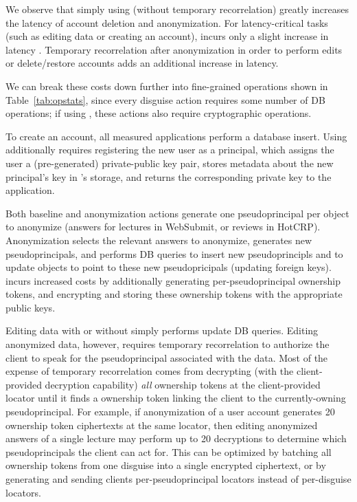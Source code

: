We observe that simply using \sys (without temporary recorrelation) greatly increases the latency of
account deletion and anonymization.  For latency-critical tasks (such as editing data or creating an
account), \sys incurs only a slight increase in latency . Temporary recorrelation
after anonymization in order to perform edits or delete/restore accounts adds an additional
 increase in latency.

We can break these costs down further into fine-grained operations shown in 
Table~\ref{tab:opstats}, since every disguise action requires some number of DB operations; if using
\sys, these actions also require cryptographic operations.

To create an account, all measured applications perform a database insert. Using \sys additionally
requires registering the new user as a principal, which assigns the user a (pre-generated)
private-public key pair, stores metadata about the new principal's key in \sys's storage, and
returns the corresponding private key to the application.

Both baseline and \sys anonymization actions generate one pseudoprincipal per object to anonymize
(\eg answers for lectures in WebSubmit, or reviews in HotCRP). Anonymization selects the relevant answers
to anonymize, generates new pseudoprincipals, and performs DB queries to insert new pseudoprincipls
and to update objects to point to these new pseudopricipals (\eg updating foreign keys).
\sys incurs increased costs by additionally generating per-pseudoprincipal ownership tokens, and 
encrypting and storing these ownership tokens with the appropriate public keys.

Editing data with or without \sys simply performs update DB queries. Editing anonymized data,
however, requires temporary recorrelation to authorize the client to speak for the pseudoprincipal
associated with the data.  Most of the expense of temporary recorrelation comes from \sys decrypting
(with the client-provided decryption capability) \emph{all} ownership tokens at the client-provided
locator until it finds a ownership token linking the client to the currently-owning pseudoprincipal.
For example, if anonymization of a user account generates 20 ownership token ciphertexts at the same
locator, then editing anonymized answers of a single lecture may perform up to 20 decryptions to
determine which pseudoprincipals the client can act for. This can be optimized by batching all
ownership tokens from one disguise into a single encrypted ciphertext, or by generating and sending
clients per-pseudoprincipal locators instead of per-disguise locators.

